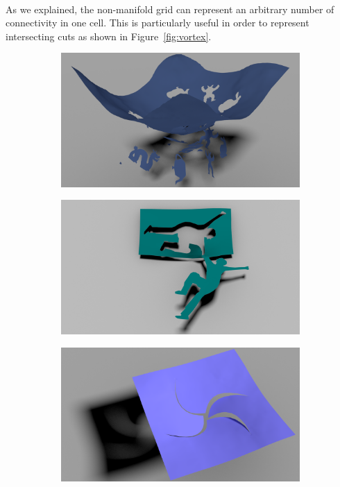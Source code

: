 \paragraph*{}
As we explained, the non-manifold grid can represent an arbitrary number of connectivity in one cell. This is particularly useful in order to represent intersecting cuts as shown in Figure~\ref{fig:vortex}.

\begin{figure}[!h]
	\centering
	\begin{subfigure}[b]{0.32\linewidth}
		\centering
		\includegraphics[width=\linewidth]{images/cutting-mig2015/Patchwork.pdf}
		\caption{\label{fig:patchwork}}
	\end{subfigure}
	\hfill
	\begin{subfigure}[b]{0.32\linewidth}
		\centering
		\includegraphics[width=\linewidth]{images/cutting-mig2015/FallingGuy.pdf}
		\caption{\label{fig:fallingguy}}
	\end{subfigure}
	\hfill
	\begin{subfigure}[b]{0.32\linewidth}
		\centering
		\includegraphics[width=\linewidth]{images/cutting-mig2015/Vortex.pdf}

\end{subfigure}
\end{figure}
